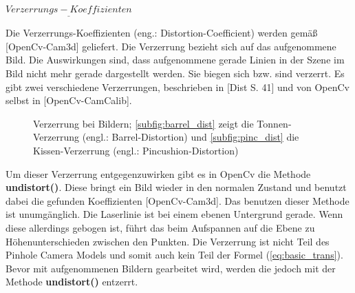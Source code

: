 		$\underline{Verzerrungs-Koeffizienten}$
		
		Die Verzerrungs-Koeffizienten (eng.: Distortion-Coefficient) werden gemäß [OpenCv-Cam3d] geliefert. Die Verzerrung bezieht sich auf das aufgenommene Bild. Die Auswirkungen sind, dass aufgenommene gerade Linien in der Szene im Bild nicht mehr gerade dargestellt werden. Sie biegen sich bzw. sind verzerrt. Es gibt zwei verschiedene Verzerrungen, beschrieben in [Dist S. 41] und von OpenCv selbst in [OpenCv-CamCalib].
		
		\begin{figure}[h]
			\centering
			\caption[Verzerrung bei Bildern]{Verzerrung bei Bildern; \ref{subfig:barrel_dist} zeigt die Tonnen-Verzerrung (engl.: Barrel-Distortion) und \ref{subfig:pinc_dist} die Kissen-Verzerrung (engl.: Pincushion-Distortion)}
			\label{fig:distortion}
		\end{figure}
	
		Um dieser Verzerrung entgegenzuwirken gibt es in OpenCv die Methode \textbf{undistort()}. Diese bringt ein Bild wieder in den normalen Zustand und benutzt dabei die gefunden Koeffizienten [OpenCv-Cam3d]. Das benutzen dieser Methode ist unumgänglich. Die Laserlinie ist bei einem ebenen Untergrund gerade. Wenn diese allerdings gebogen ist, führt das beim Aufspannen auf die Ebene zu Höhenunterschieden zwischen den Punkten. Die Verzerrung ist nicht Teil des Pinhole Camera Models und somit auch kein Teil der Formel (\ref{eq:basic_trans}). Bevor mit aufgenommenen Bildern gearbeitet wird, werden die jedoch mit der Methode \textbf{undistort()} entzerrt.
		
